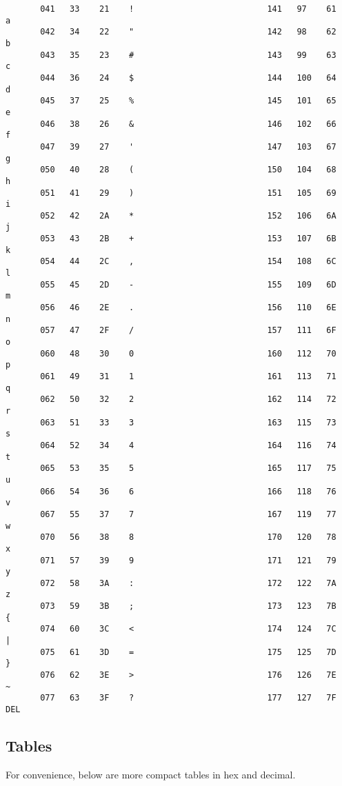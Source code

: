 \begin{verbatim}
       041   33    21    !                           141   97    61    a
       042   34    22    "                           142   98    62    b
       043   35    23    #                           143   99    63    c
       044   36    24    $                           144   100   64    d
       045   37    25    %                           145   101   65    e
       046   38    26    &                           146   102   66    f
       047   39    27    '                           147   103   67    g
       050   40    28    (                           150   104   68    h
       051   41    29    )                           151   105   69    i
       052   42    2A    *                           152   106   6A    j
       053   43    2B    +                           153   107   6B    k
       054   44    2C    ,                           154   108   6C    l
       055   45    2D    -                           155   109   6D    m
       056   46    2E    .                           156   110   6E    n
       057   47    2F    /                           157   111   6F    o
       060   48    30    0                           160   112   70    p
       061   49    31    1                           161   113   71    q
       062   50    32    2                           162   114   72    r
       063   51    33    3                           163   115   73    s
       064   52    34    4                           164   116   74    t
       065   53    35    5                           165   117   75    u
       066   54    36    6                           166   118   76    v
       067   55    37    7                           167   119   77    w
       070   56    38    8                           170   120   78    x
       071   57    39    9                           171   121   79    y
       072   58    3A    :                           172   122   7A    z
       073   59    3B    ;                           173   123   7B    {
       074   60    3C    <                           174   124   7C    |
       075   61    3D    =                           175   125   7D    }
       076   62    3E    >                           176   126   7E    ~
       077   63    3F    ?                           177   127   7F    DEL
\end{verbatim}

\subsection{Tables}
For convenience, below are more compact tables in hex and decimal.

